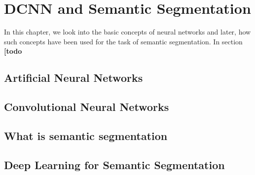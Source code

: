 
\chapter{DCNN and Semantic Segmentation}

	In this chapter, we look into the basic concepts of neural networks and later, how such concepts have been used for the task of semantic segmentation. In section  \textbf{[todo}

\section{Artificial Neural Networks}


\section{Convolutional Neural Networks}

\section{What is semantic segmentation}

\section{Deep Learning for Semantic Segmentation}